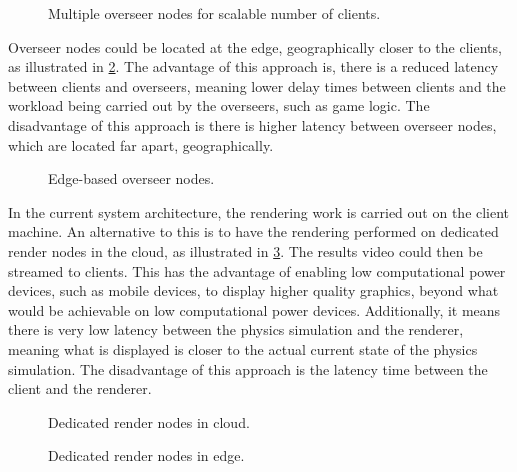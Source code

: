 \begin{figure}
	\centering
	\scalebox{1.25}{}
	\caption{Multiple overseer nodes for scalable number of clients.}
	\label{MultiOverseer}
\end{figure}

Overseer nodes could be located at the edge, geographically closer to the clients, as illustrated in \ref{EdgeOverseer}. The advantage of this approach is, there is a reduced latency between clients and overseers, meaning lower delay times between clients and the workload being carried out by the overseers, such as game logic. The disadvantage of this approach is there is higher latency between overseer nodes, which are located far apart, geographically.

\begin{figure}
	\centering
	\scalebox{1.25}{}
	\caption{Edge-based overseer nodes.}
	\label{EdgeOverseer}
\end{figure}

In the current system architecture, the rendering work is carried out on the client machine. An alternative to this is to have the rendering performed on dedicated render nodes in the cloud, as illustrated in \ref{RenderNodes}. The results video could then be streamed to clients. This has the advantage of enabling low computational power devices, such as mobile devices, to display higher quality graphics, beyond what would be achievable on low computational power devices. Additionally, it means there is very low latency between the physics simulation and the renderer, meaning what is displayed is closer to the actual current state of the physics simulation. The disadvantage of this approach is the latency time between the client and the renderer.


\begin{figure}
	\centering
	\scalebox{1.25}{}
	\caption{Dedicated render nodes in cloud.}
	\label{RenderNodes}
\end{figure}

\begin{figure}
	\centering
	\scalebox{1.25}{}
	\caption{Dedicated render nodes in edge.}
\end{figure}


